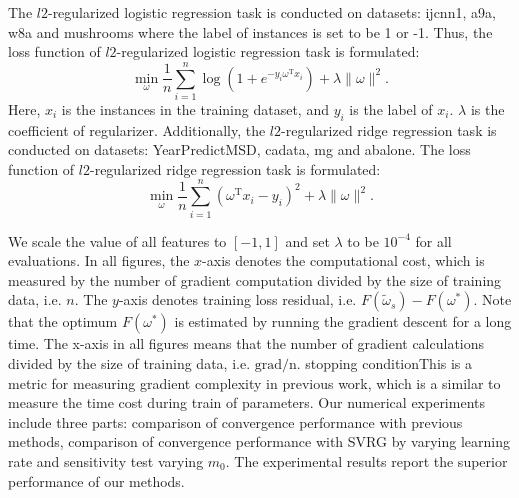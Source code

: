 \documentclass[conference]{IEEEtran}
\begin{document}
 The $l2$-regularized logistic regression task is conducted on datasets: ijcnn1, a9a, w8a and mushrooms where the label of instances  is set to be 1 or -1. Thus, the loss function of $l2$-regularized logistic regression task is formulated:
\begin{equation}
\label{logistic_reg}
\min\limits_\omega \frac{1}{n}\sum\limits_{i=1}^n \log(1+e^{-y_i \omega^\mathrm{T} x_i }) + \lambda \parallel \omega \parallel^2.
\end{equation} Here, $x_i$ is the instances in the training dataset, and $y_i$ is the label of $x_i$. $\lambda$ is the coefficient of regularizer. Additionally, the $l2$-regularized ridge regression task is conducted on  datasets: YearPredictMSD, cadata, mg and abalone. The loss function of $l2$-regularized ridge regression task is formulated:
\begin{equation}
\label{ridge_reg}
\min\limits_\omega \frac{1}{n}\sum\limits_{i=1}^n\left(\omega^{\mathrm{T}}x_i-y_i\right)^2 + \lambda \parallel \omega \parallel^2.
\end{equation}

We scale the value of all features to $[-1,1]$ and set  $\lambda$ to be $10^{-4}$ for all evaluations. 
In all figures, the $x$-axis denotes the computational cost, which is measured by the number of gradient computation divided by the size of training data, i.e. $n$. The $y$-axis denotes training loss residual, i.e. $F(\tilde{\omega}_s) - F(\omega^{*})$. Note that the optimum $F(\omega^{*})$ is estimated by running the gradient descent for a long time. The x-axis in all figures means that the number of gradient calculations divided by the size of training data, i.e. $\mathrm{grad/n}$. stopping conditionThis is a metric for measuring gradient complexity in previous work, which is a similar to measure the time cost during train of parameters. Our numerical experiments include three parts: comparison of convergence performance with previous methods, comparison of convergence performance with SVRG by varying learning rate and sensitivity test varying $m_0$. The experimental results report the superior performance of our methods. 
\end{document}
